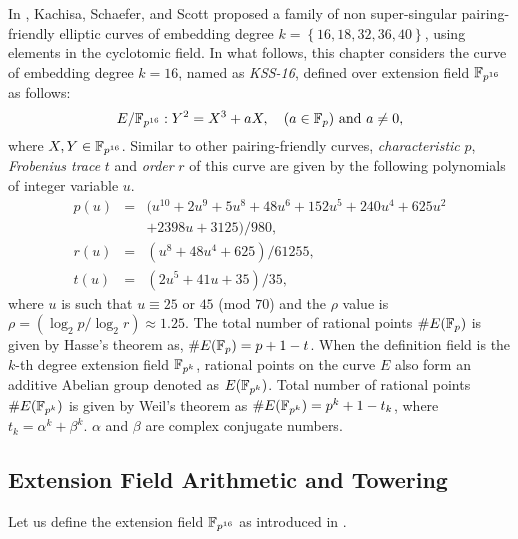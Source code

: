 In \cite{EPRINT:KacSchSco07}, Kachisa, Schaefer, and Scott proposed a family of non super-singular pairing-friendly elliptic curves of embedding degree $k = \left\lbrace16, 18, 32, 36, 40\right\rbrace$, using elements in the cyclotomic field. 
 In what follows, this chapter considers  the curve of embedding degree $k =16$, named as \textit{KSS-16}, defined over extension field $\mathbb{F}_{p^{16}}$ as follows:
\begin{equation}\label{eq:KSS_16}
E/\mathbb{F}_{p^{16}}:Y^2=X^3+aX, \quad \mbox{($a \in {\mathbb{F}}_{p}$) and  $a \neq 0$},
\end{equation}
 where $X,Y \in \mathbb{F}_{p^{16}}$. Similar to other pairing-friendly curves,  \textit{characteristic} $p$, \textit{Frobenius trace} $t$ and \textit{order} $r$ of this curve are given by the following polynomials of  integer variable $u$.
\begin{subequations}
\begin{eqnarray}
p(u) &= & (u^{10} +2u^9 +5u^8 +48u^6 +152u^5 +240u^4 +625u^2  \nonumber \\ 
&& +2398u +3125)/980,  \\\label{eq:kss_16_char}
r(u) &= & (u^8 +48u^4 +625)/61255, \label{eq:kss_16_degree}  \\
t(u) &=& (2u^5 +41u+35)/35, \label{eq:kss_16_trace} 
\end{eqnarray}
\end{subequations} 
where $u$ is such that $u \equiv 25$ or $45$ (mod $70$) and the $\rho$ value is $\rho = (\log_2 p/\log_2 r) \approx 1.25$. 
The total number of rational points $\#E({\mathbb{F}}_{p})$ is given by Hasse's theorem as, $\#E({\mathbb{F}}_{p}) = p+1-t$. 
When the definition field is the $k$-th degree extension field $\mathbb{F}_{p^k}$, rational points on the curve $E$ also form an additive Abelian group denoted as $E(\mathbb{F}_{p^k})$. Total number of rational points $\#E(\mathbb{F}_{p^k})$ is given by  Weil's theorem \cite{weil1949numbers} as 
$\#E(\mathbb{F}_{p^k}) = p^k +1- t_k$, where $t_k =  \alpha^k + \beta^k$.  $\alpha$ and $\beta$ are  complex conjugate numbers.


\subsection{Extension Field Arithmetic and Towering}
\label{sec:ch:indo:ext_field_arith_ksss16}
Let us define the extension field $\mathbb{F}_{p^{16}}$ as introduced in .
